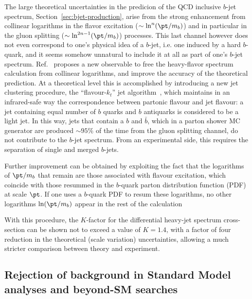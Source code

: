 The large theoretical uncertainties in the predicion of the QCD inclusive $b$-jet spectrum, Section~\ref{sec:bjet-production}, arise from the strong enhancement from collinear logarithms in the flavor excitation ($\sim\ln^n(\pt/m_b)$) and in particular in the gluon splitting ($\sim\ln^{2n-1}(\pt/m_b)$) processes. This last channel however does not even correspond to one's physical idea of a $b$-jet, i.e. one induced by a hard $b$-quark, and it seems somehow unnatural to include it at all as part of one's $b$-jet spectrum.
Ref.~\cite{Salam.AccurateHQ} proposes a new observable to free the heavy-flavor spectrum calculation from collinear logarithms, and improve the accuracy of the theoretical prediction.
At a theoretical level this is accomplished by introducing a new jet clustering procedure,
the ``\hspace{.3mm}flavour-$k_t$'' jet algorithm~\cite{flavorkt}, which maintains in an infrared-safe way the correspondence between partonic flavour and jet flavour: a jet containing equal number of $b$ quarks and $b$ antiquarks is considered to be a light jet. In this way,
jets that contain a $b$ and $\bar{b}$, which in a parton shower MC generator are produced $\sim95\%$ of the time from the gluon splitting channel, do not contribute to the
$b$-jet spectrum. %
From an experimental side, this requires the separation of single and merged $b$-jets.

Further improvement can be obtained by exploiting the fact that the logarithms
of $\pt/m_b$ that remain are those associated with flavour excitation, which coincide with
those resummed in the $b$-quark parton distribution function (PDF) at scale $\pt$. If one uses
a $b$-quark PDF to resum these logarithms, no other logarithms $\ln(\pt/m_b)$ appear in the
rest of the calculation

With this procedure, the $K$-factor for the differential heavy-jet spectrum cross-section can be shown not to exceed a value of $K=1.4$, with a factor of four reduction in the theoretical (scale variation) uncertainties, allowing a much stricter comparison between theory and experiment.
%
\subsection{Rejection of background in Standard Model analyses and beyond-SM searches}

